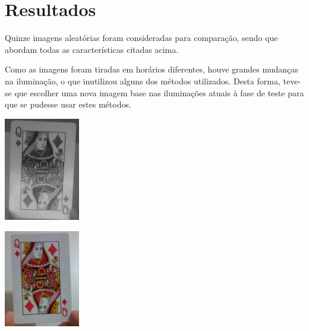 \documentclass[conference]{IEEEtran}
\begin{document}
\section{Resultados} 
\label{sec:meth} 
  \nobreak\hspace{.16667em plus .08333em} 
  Quinze imagens aleat\'orias foram consideradas para compara\c{c}\~ao, sendo que abordam todas as caracter\'isticas citadas 
  acima.
  
  Como as imagens foram tiradas em hor\'arios diferentes, houve grandes mudan\c{c}as na ilumina\c{c}\~ao, o que inutilizou 
  alguns dos m\'etodos utilizados. Desta forma, teve-se que escolher uma nova imagem base nas ilumina\c{c}\~oes atuais \`a fase 
  de teste para que se pudesse usar estes m\'etodos.
		
		\vspace{2\baselineskip}\vspace{-\parskip}
 		\begin{minipage}{\linewidth}
 		\centering
 		\includegraphics[width=1.3in]{9}
 		\end{minipage}			
 		
 		\vspace{2\baselineskip}\vspace{-\parskip}
 		\begin{minipage}{\linewidth}
 		\centering
 		\includegraphics[width=1.3in]{c2}
 		\end{minipage}	
 
\end{document}
